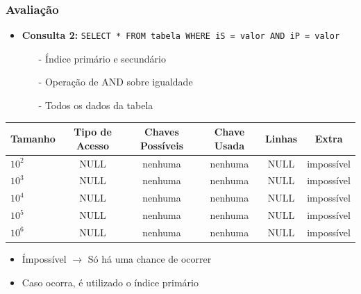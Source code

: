 \documentclass[10pt]{beamer}
\begin{document}
\begin{frame}[fragile]
  \frametitle{Avaliação}

    \begin{itemize}
      \item \textbf{Consulta 2: } \footnotesize{\texttt{SELECT * FROM tabela WHERE iS = valor AND iP = valor}}
      \begin{itemize}
        \item[-] Índice primário e secundário
        \item[-] Operação de AND sobre igualdade
        \item[-] Todos os dados da tabela
      \end{itemize}

    \end{itemize}

     \begin{table}[!htb]
    \footnotesize
    \centering
    \begin{tabular}{lccccc}
      \toprule
      \textbf{Tamanho} & \textbf{Tipo de Acesso}  & \textbf{Chaves Possíveis}  & \textbf{Chave Usada} & \textbf{Linhas} & \textbf{Extra}  \\
      \midrule
      $10^2$  & NULL  &  nenhuma  & nenhuma  & NULL  & impossível \\
      $10^3$  & NULL  &  nenhuma  & nenhuma  & NULL  & impossível \\
      $10^4$  & NULL  &  nenhuma  & nenhuma  & NULL  & impossível \\
      $10^5$  & NULL  &  nenhuma  & nenhuma  & NULL  & impossível \\
      $10^6$  & NULL  &  nenhuma  & nenhuma  & NULL  & impossível \\

      \bottomrule
    \end{tabular}
    \end{table}
   
    \begin{itemize}
    \item Ímpossível $\to$ Só há uma chance de ocorrer
    \item Caso ocorra, é utilizado o índice primário
    \end{itemize}


\end{frame}
\end{document}
